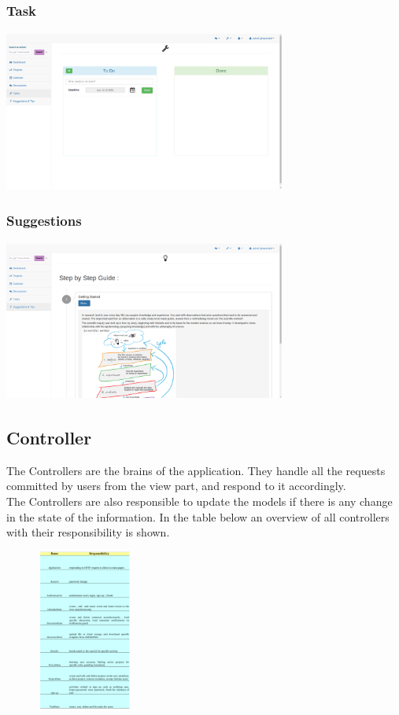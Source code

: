 \subsubsection{Task}

\begin{center}
\includegraphics[height=200px, width=350px]{./img/dsgn_img/task.png}
	
\end{center}

\subsubsection{Suggestions}

\begin{center}
\includegraphics[height=200px, width=350px]{./img/dsgn_img/suggestions.png}
	
\end{center}

\subsection{Controller}
The Controllers are the brains of the application. They handle all the requests committed by users from the view part, and respond to it accordingly.\\
The Controllers are also responsible to update the models if there is any change in the state of the information. In the table below an overview of all controllers with their responsibility is shown.\\

\begin{center}
\includegraphics[height=200px, width=200px]{./img/dsgn_img/controllers.png}
	
\end{center}